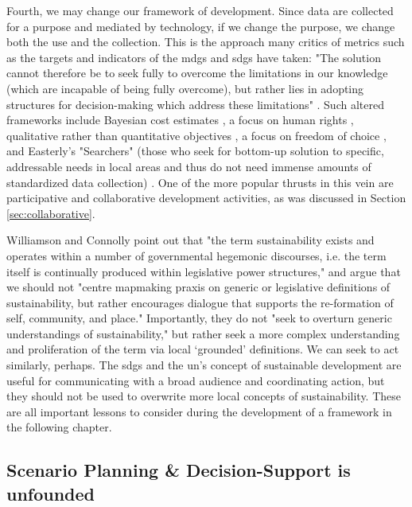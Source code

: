 Fourth, we may change our framework of development. Since data are collected for a purpose and mediated by technology, if we change the purpose, we change both the use and the collection. This is the approach many critics of metrics such as the targets and indicators of the \acp{mdg} and \acp{sdg} have taken: "The solution cannot therefore be to seek fully to overcome the limitations in our knowledge (which are incapable of being fully overcome), but rather lies in adopting structures for decision-making which address these limitations" \cite{reddyGlobalDevelopmentGoals2008}.	Such altered frameworks include Bayesian cost estimates \cite{reddyGlobalDevelopmentGoals2008}, a focus on human rights \cite{alstonShipsPassingNight2005}, qualitative rather than quantitative objectives \cite{fukuda-parrPowerNumbersCritical2014}, a focus on freedom of choice \cite{senFreedomChoiceConcept1988}, and Easterly's "Searchers" (those who seek for bottom-up solution to specific, addressable needs in local areas and thus do not need immense amounts of standardized data collection) \cite{easterlyWhiteManBurden2007a}. One of the more popular thrusts in this vein are participative and collaborative development activities, as was discussed in Section \ref{sec:collaborative}.

Williamson and Connolly point out that "the term sustainability exists and operates within a number of governmental hegemonic discourses, i.e. the term itself is continually produced within legislative power structures," and argue that we should not "centre mapmaking praxis on generic or legislative definitions of sustainability, but rather encourages dialogue that supports the re-formation of self, community, and place." Importantly, they do not "seek to overturn generic understandings of sustainability," but rather seek a more complex understanding and proliferation of the term via local `grounded' definitions. \cite{williamsonTheirworkDevelopmentSustainable2011}
We can seek to act similarly, perhaps. The \acp{sdg} and the \ac{un}'s concept of sustainable development are useful for communicating with a broad audience and coordinating action, but they should not be used to overwrite more local concepts of sustainability. These are all important lessons to consider during the development of a framework in the following chapter.


\subsection{Scenario Planning \& Decision-Support is unfounded} \label{sec:scenario_critique}

